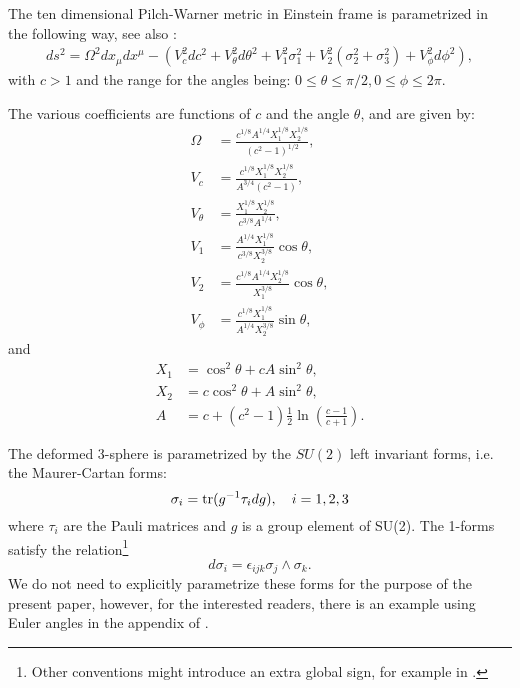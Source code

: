 The ten dimensional Pilch-Warner metric in Einstein frame is parametrized in the following way, see also \cite{Buchel:2000cn}:
\begin{align}\label{eq:PWmetric}
ds^2 =
\Omega^2 dx_\mu dx^\mu -\left(
V_c^2 dc^2 + V_\theta^2 d\theta^2 + V_1^2 \sigma_1^2 + V_2^2 (\sigma_2^2 + \sigma_3^2) + V_\phi^2 d\phi^2\right),
\end{align}
with $c>1$ and the range for the angles being: $ 0\leq \theta \leq\pi/2, 0\leq \phi \leq 2\pi$. 

The various coefficients are functions of $c$ and the angle $\theta$, and are given by:
\begin{align}\label{eq:PWvielbeins}
\Omega &= \frac{c^{1/8} A^{1/4} X_1^{1/8} X_2^{1/8}}{(c^2 - 1)^{1/2}},\nonumber\\
V_c &= \frac{c^{1/8}X_1^{1/8} X_2^{1/8}}{A^{3/4} (c^2-1)},\nonumber\\
V_\theta &= \frac{X_1^{1/8} X_2^{1/8}}{c^{3/8}A^{1/4}},\nonumber\\
V_1 &= \frac{A^{1/4}X_1^{1/8} }{c^{3/8}X_2^{3/8}} \cos\theta,\nonumber\\
V_2 &= \frac{c^{1/8}A^{1/4}X_2^{1/8} }{X_1^{3/8}} \cos\theta, \nonumber\\
V_\phi &= \frac{c^{1/8}X_1^{1/8} }{A^{1/4}X_2^{3/8}} \sin\theta,
\end{align}
and
\begin{align}
X_1 &=  \cos^2\theta + cA  \sin^2\theta,\nonumber\\
X_2 &= c \cos^2\theta + A  \sin^2\theta, \nonumber\\
A &= c+(c^2 -1)\frac{1}{2}\ln\left(\frac{c-1}{c+1}\right).
\end{align}

The deformed 3-sphere is parametrized by the $SU(2)$ left invariant forms, i.e. the Maurer-Cartan forms:
\begin{equation}
\sigma_i = \mathop{\mathrm{tr}}(g^{-1}\tau_i d g), \quad i = 1,2,3
\end{equation}
where $\tau_i$ are the Pauli matrices and $g$ is a group element of SU(2). The 1-forms satisfy the relation\footnote{Other conventions might introduce an extra global sign, for example in \cite{Buchel:2000cn}.}
\begin{equation}
 d\sigma_i  = \epsilon_{i j k} \sigma_j \wedge \sigma_k.
\end{equation}
We do not need to explicitly parametrize these forms for the purpose of the present paper, however, for the interested readers, there is an example using Euler angles in the appendix of \cite{Chen-Lin:2015xlh}. 


